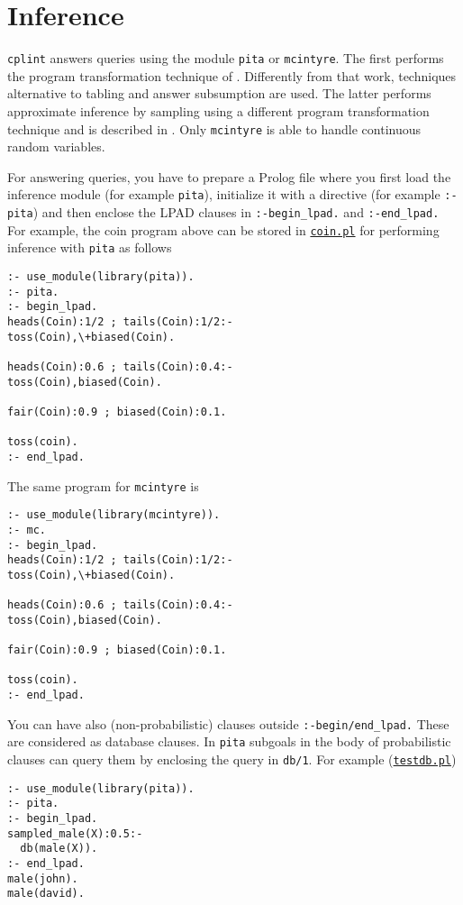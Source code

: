 \section{Inference}
\label{inf}
\texttt{cplint} answers queries using the module \verb|pita| or \verb|mcintyre|. The first performs the program transformation technique of \cite{RigSwi10-ICLP10-IC}. Differently from that work, techniques alternative to tabling and answer subsumption are used. The latter performs approximate inference by sampling
using a different program transformation technique and is described in \cite{Rig13-FI-IJ}. Only \verb|mcintyre| is able to handle continuous
random variables.

For answering queries, you have to prepare a Prolog file where you first load the inference module (for example \verb|pita|), initialize it with a directive (for example \verb|:- pita|) and then enclose the LPAD
clauses in \verb|:-begin_lpad.| and \verb|:-end_lpad.| For example, the coin program above can be stored in \href{http://cplint.lamping.unife.it/example/inference/coin.pl}{\texttt{coin.pl}} for performing inference
with \verb|pita| as follows
\begin{verbatim}
:- use_module(library(pita)).
:- pita.
:- begin_lpad.
heads(Coin):1/2 ; tails(Coin):1/2:- 
toss(Coin),\+biased(Coin).

heads(Coin):0.6 ; tails(Coin):0.4:- 
toss(Coin),biased(Coin).

fair(Coin):0.9 ; biased(Coin):0.1.

toss(coin).
:- end_lpad.
\end{verbatim}
The same program for \verb|mcintyre| is
\begin{verbatim}
:- use_module(library(mcintyre)).
:- mc.
:- begin_lpad.
heads(Coin):1/2 ; tails(Coin):1/2:- 
toss(Coin),\+biased(Coin).

heads(Coin):0.6 ; tails(Coin):0.4:- 
toss(Coin),biased(Coin).

fair(Coin):0.9 ; biased(Coin):0.1.

toss(coin).
:- end_lpad.
\end{verbatim}
You can have also (non-probabilistic) clauses outside \verb|:-begin/end_lpad.| These are considered as database clauses.
In \verb|pita| subgoals in the body of probabilistic clauses can query them by enclosing the query in \verb|db/1|.
For example (\href{http://cplint.lamping.unife.it/example/inference/testdb.pl}{\texttt{testdb.pl}})
\begin{verbatim}
:- use_module(library(pita)).
:- pita.
:- begin_lpad.
sampled_male(X):0.5:-
  db(male(X)).
:- end_lpad.
male(john).
male(david).
\end{verbatim}
